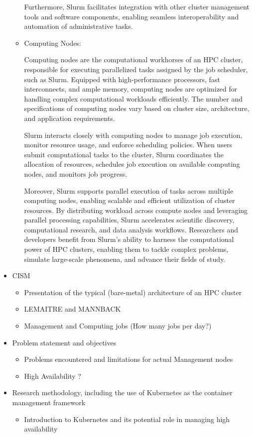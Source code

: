 \documentclass{article}
\begin{document}
\begin{itemize}
\begin{itemize}
Furthermore, Slurm facilitates integration with other cluster management tools and software components, enabling seamless interoperability and automation of administrative tasks.


    \item Computing Nodes:

Computing nodes are the computational workhorses of an HPC cluster, responsible for executing parallelized tasks assigned by the job scheduler, such as Slurm. Equipped with high-performance processors, fast interconnects, and ample memory, computing nodes are optimized for handling complex computational workloads efficiently. The number and specifications of computing nodes vary based on cluster size, architecture, and application requirements.

Slurm interacts closely with computing nodes to manage job execution, monitor resource usage, and enforce scheduling policies. When users submit computational tasks to the cluster, Slurm coordinates the allocation of resources, schedules job execution on available computing nodes, and monitors job progress.

Moreover, Slurm supports parallel execution of tasks across multiple computing nodes, enabling scalable and efficient utilization of cluster resources. By distributing workload across compute nodes and leveraging parallel processing capabilities, Slurm accelerates scientific discovery, computational research, and data analysis workflows. Researchers and developers benefit from Slurm's ability to harness the computational power of HPC clusters, enabling them to tackle complex problems, simulate large-scale phenomena, and advance their fields of study.


\end{itemize}
    
    \item CISM
        \begin{itemize}
            \item Presentation of the typical (bare-metal) architecture of an HPC cluster
            \item LEMAITRE and MANNBACK
            \item Management and Computing jobs (How many jobs per day?)
        \end{itemize}
    
    \item Problem statement and objectives
        \begin{itemize}
            \item Problems encountered and limitations for actual Management nodes
            \item High Availability ?
        \end{itemize}
    \item Research methodology, including the use of Kubernetes as the container management framework
    \begin{itemize}
          \item Introduction to Kubernetes and its potential role in managing high availability
    \end{itemize}
\end{itemize}
\end{document}
